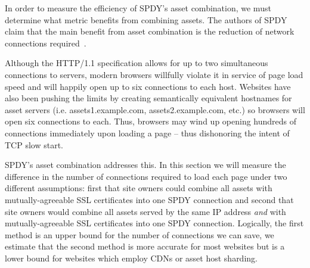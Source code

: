 \documentclass[10pt,letterpaper,notitlepage]{article}
\begin{document}
In order to measure the efficiency of SPDY's asset combination, we must
determine what metric benefits from combining assets. The authors of SPDY claim
that the main benefit from asset combination is the reduction of network
connections required~\cite{spdy-whitepaper}.

Although the HTTP/1.1 specification allows for up to two simultaneous
connections to servers, modern browsers willfully violate it in service of page
load speed and will happily open up to six connections to each host. Websites
have also been pushing the limits by creating semantically equivalent hostnames
for asset servers (i.e. assets1.example.com, assets2.example.com, etc.) so
browsers will open six connections to each. Thus, browsers may wind up opening
hundreds of connections immediately upon loading a page -- thus dishonoring the
intent of TCP slow start.

SPDY's asset combination addresses this. In this section we will measure the
difference in the number of connections required to load each page under two
different assumptions: first that site owners could combine all assets with
mutually-agreeable SSL certificates into one SPDY connection and second that
site owners would combine all assets served by the same IP address \textit{and}
with mutually-agreeable SSL certificates into one SPDY connection. Logically,
the first method is an upper bound for the number of connections we can save,
we estimate that the second method is more accurate for most websites but is a
lower bound for websites which employ CDNs or asset host sharding.
\end{document}
